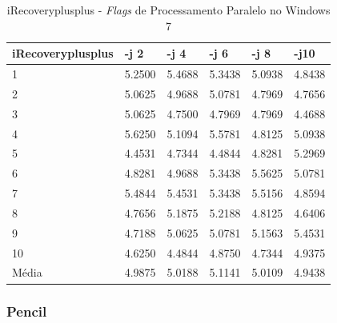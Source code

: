 \begin{apendicesenv}
\begin{table}[!ht]
\centering
\tiny
\caption{iRecoveryplusplus - \textit{Flags} de Processamento Paralelo no Windows 7}
\label{tab:flag_processamento_paralelo:windows:irecoveryplusplus}
\begin{tabular}{llllll}
\textbf{iRecoveryplusplus} & \textbf{-j 2} & \textbf{-j 4} & \textbf{-j 6} & \textbf{-j 8} & \textbf{-j10}  \\ \toprule
1                          & 5.2500        &  5.4688       &  5.3438       & 5.0938        & 4.8438      \\ 
2                          & 5.0625        &  4.9688       &  5.0781       &  4.7969       &  4.7656     \\ 
3                          & 5.0625        &  4.7500       &  4.7969       &  4.7969       &  4.4688     \\ 
4                          & 5.6250        &  5.1094       &  5.5781       &  4.8125       &  5.0938     \\ 
5                          & 4.4531        &  4.7344       &  4.4844       &  4.8281       &  5.2969     \\ 
6                          & 4.8281        &  4.9688       &  5.3438       &  5.5625       &  5.0781     \\ 
7                          & 5.4844        &  5.4531       &  5.3438       &  5.5156       &  4.8594     \\ 
8                          & 4.7656        &  5.1875       &  5.2188       &  4.8125       &  4.6406     \\ 
9                          & 4.7188        &  5.0625       &  5.0781       &  5.1563       &  5.4531     \\ 
10                         & 4.6250        &  4.4844       &  4.8750       &  4.7344       &  4.9375     \\ \bottomrule
Média                      & 4.9875        &  5.0188       &  5.1141       &  5.0109       &  4.9438     \\ 
\end{tabular}
\end{table}

\clearpage
\subsubsection*{Pencil}


\end{apendicesenv}
